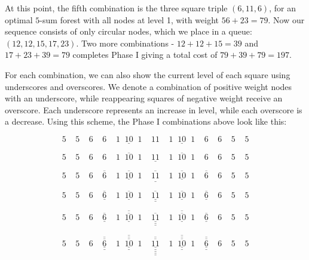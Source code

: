 \documentclass[12pt]{article}
\begin{document}
\noindent At this point, the fifth combination is the three square triple $(6, 11, 6)$, 
for an optimal $5$-sum forest with all nodes at level 1, with weight 
$56 + 23 = 79$. Now our sequence consists of only circular nodes, which 
we place in a queue: $(12, 12, 15, 17, 23)$. Two more combinations - 
$12 + 12 + 15 = 39$ and $17 + 23 + 39 = 79$ completes Phase I giving a total cost
of $79 + 39 + 79 = 197$. 

For each combination, we can also show the current level of each square using 
underscores and overscores. We denote a combination of positive 
weight nodes with an underscore, while reappearing squares of negative weight 
receive an overscore. Each underscore represents an increase in level, while each 
overscore is a decrease. Using this scheme, the Phase I combinations above look
like this:

$$ 5 \;\;\;\; 5 \;\;\;\; 6 \;\;\;\; 6 \;\;\;\; \underline{1\;\;10\;\;1} \;\;\;\; 11 \;\;\;\; 
\underline{1\;\;10\;\;1} \;\;\;\; 6 \;\;\;\; 6  \;\;\;\; 5 \;\;\;\; 5$$

$$ 5 \;\;\;\; 5 \;\;\;\; \underline{6 \;\;\;\; 6 \;\;\;\; 1\;\;\overline{10}\;\;1
\;\;\;\; 11 \;\;\;\; 1\;\;\overline{10}\;\;1 \;\;\;\; 6 \;\;\;\; 6}  \;\;\;\; 5 \;\;\;\; 5$$

$$ \underline{5 \;\;\;\; 5 \;\;\;\; 6 \;\;\;\; \overline{6} \;\;\;\; 1\;\;
\underline{\overline{10}}\;\; 1 \;\;\;\; \overline{11} \;\;\;\; 1\;\;
\underline{\overline{10}}\;\;1 \;\;\;\; \overline{6} \;\;\;\; 6  \;\;\;\; 5 \;\;\;\; 5}$$

$$ \underline{5 \;\;\;\; 5 \;\;\;\; 6 \;\;\;\; \underline{\overline{6}} \;\;\;\; 1\;\;
\underline{\overline{10}}\;\; 1 \;\;\;\; \underline{\overline{11}} \;\;\;\; 1\;\;
\underline{\overline{10}}\;\;1 \;\;\;\; \underline{\overline{6}} \;\;\;\; 6  \;\;\;\; 5 \;\;\;\; 5}$$

$$ \underline{5 \;\;\;\; 5 \;\;\;\; \underline{6 \;\;\;\; \underline{\overline{6}} \;\;\;\; 1\;\;
\underline{\overline{\overline{10}}}\;\; 1 \;\;\;\; \underline{\overline{11}} \;\;\;\; 1\;\;
\underline{\overline{\overline{10}}}\;\;1 \;\;\;\; \underline{\overline{6}} \;\;\;\; 6}  \;\;\;\; 5 \;\;\;\; 5}$$

$$  \underline{\underline{5 \;\;\;\; 5 \;\;\;\; \underline{6 \;\;\;\; \underline{\underline{\overline{\overline{6}}}} \;\;\;\; 1\;\;
\underline{\underline{\overline{\overline{\overline{10}}}}}\;\; 1 \;\;\;\; \underline{\underline{\overline{\overline{11}}}} \;\;\;\; 1\;\;
\underline{\underline{\overline{\overline{\overline{10}}}}}\;\;1 \;\;\;\; \underline{\underline{\overline{\overline{6}}}} \;\;\;\; 6} \;\;\;\; 5 \;\;\;\; 5}}$$
\end{document}
